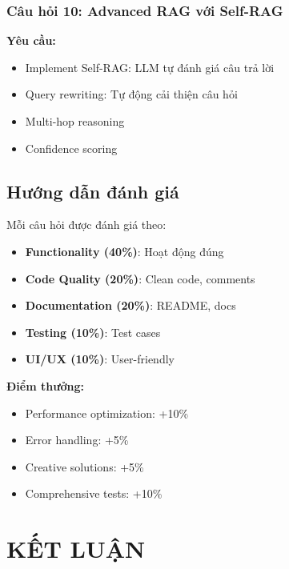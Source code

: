 \documentclass[a4paper]{article}
\begin{document}
\subsubsection{Câu hỏi 10: Advanced RAG với Self-RAG}
\textbf{Yêu cầu:}
\begin{itemize}
    \item Implement Self-RAG: LLM tự đánh giá câu trả lời
    \item Query rewriting: Tự động cải thiện câu hỏi
    \item Multi-hop reasoning
    \item Confidence scoring
\end{itemize}

\subsection{Hướng dẫn đánh giá}
Mỗi câu hỏi được đánh giá theo:
\begin{itemize}
    \item \textbf{Functionality (40\%)}: Hoạt động đúng
    \item \textbf{Code Quality (20\%)}: Clean code, comments
    \item \textbf{Documentation (20\%)}: README, docs
    \item \textbf{Testing (10\%)}: Test cases
    \item \textbf{UI/UX (10\%)}: User-friendly
\end{itemize}
\textbf{Điểm thưởng:}
\begin{itemize}
    \item Performance optimization: +10\%
    \item Error handling: +5\%
    \item Creative solutions: +5\%
    \item Comprehensive tests: +10\%
\end{itemize}
\newpage
\section{KẾT LUẬN} %
\end{document}
